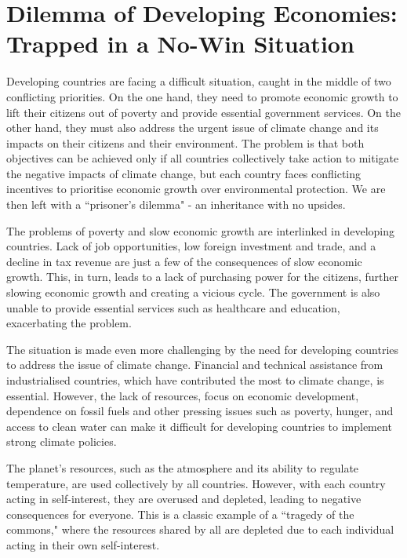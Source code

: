 \documentclass[12pt,a4paper]{article}
\begin{document}
\section*{Dilemma of Developing Economies: Trapped in a No-Win Situation}
Developing countries are facing a difficult situation, caught in the middle of two conflicting priorities. On the one hand, they need to promote economic growth to lift their citizens out of poverty and provide essential government services. On the other hand, they must also address the urgent issue of climate change and its impacts on their citizens and their environment. The problem is that both objectives can be achieved only if all countries collectively take action to mitigate the negative impacts of climate change, but each country faces conflicting incentives to prioritise economic growth over environmental protection. We are then left with a ``prisoner's dilemma"  - an inheritance with no upsides.  \par
The problems of poverty and slow economic growth are interlinked in developing countries. Lack of job opportunities, low foreign investment and trade, and a decline in tax revenue are just a few of the consequences of slow economic growth. This, in turn, leads to a lack of purchasing power for the citizens, further slowing economic growth and creating a vicious cycle. The government is also unable to provide essential services such as healthcare and education, exacerbating the problem. \par
The situation is made even more challenging by the need for developing countries to address the issue of climate change. Financial and technical assistance from industrialised countries, which have contributed the most to climate change, is essential. However, the lack of resources, focus on economic development, dependence on fossil fuels and other pressing issues such as poverty, hunger, and access to clean water can make it difficult for developing countries to implement strong climate policies. \par
The planet's resources, such as the atmosphere and its ability to regulate temperature, are used collectively by all countries. However, with each country acting in self-interest, they are overused and depleted, leading to negative consequences for everyone. This is a classic example of a ``tragedy of the commons," where the resources shared by all are depleted due to each individual acting in their own self-interest.
\end{document}
